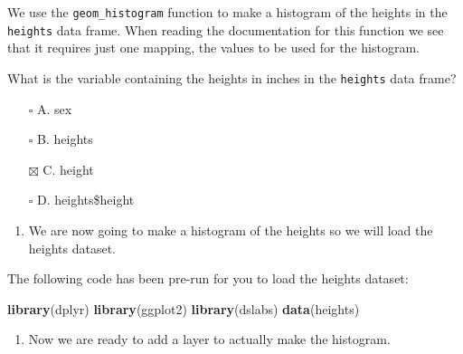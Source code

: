 \documentclass[
]{article}
\newenvironment{Shaded}{\begin{snugshade}}{\end{snugshade}}
\newcommand{\CommentTok}[1]{\textcolor[rgb]{0.56,0.35,0.01}{\textit{#1}}}
\newcommand{\KeywordTok}[1]{\textcolor[rgb]{0.13,0.29,0.53}{\textbf{#1}}}
\newcommand{\NormalTok}[1]{#1}
\newcommand{\OperatorTok}[1]{\textcolor[rgb]{0.81,0.36,0.00}{\textbf{#1}}}
\newcommand{\StringTok}[1]{\textcolor[rgb]{0.31,0.60,0.02}{#1}}
\providecommand{\tightlist}{%
  \setlength{\itemsep}{0pt}\setlength{\parskip}{0pt}}
\begin{document}
We use the \texttt{geom\_histogram} function to make a histogram of the
heights in the \texttt{heights} data frame. When reading the
documentation for this function we see that it requires just one
mapping, the values to be used for the histogram.

What is the variable containing the heights in inches in the
\texttt{heights} data frame?

\begin{itemize}
\tightlist
\item[$\square$]
  A. sex
\item[$\square$]
  B. heights
\item[$\boxtimes$]
  C. height
\item[$\square$]
  D. heights\$height
\end{itemize}

\begin{enumerate}
\def\labelenumi{\arabic{enumi}.}
\setcounter{enumi}{15}
\tightlist
\item
  We are now going to make a histogram of the heights so we will load
  the heights dataset.
\end{enumerate}

The following code has been pre-run for you to load the heights dataset:

\begin{Shaded}
\begin{Highlighting}[]
\KeywordTok{library}\NormalTok{(dplyr)}
\KeywordTok{library}\NormalTok{(ggplot2)}
\KeywordTok{library}\NormalTok{(dslabs)}
\KeywordTok{data}\NormalTok{(heights)}
\end{Highlighting}
\end{Shaded}

\begin{Shaded}
\end{Shaded}

\begin{enumerate}
\def\labelenumi{\arabic{enumi}.}
\setcounter{enumi}{16}
\tightlist
\item
  Now we are ready to add a layer to actually make the histogram.
\end{enumerate}

\begin{Shaded}
\end{Shaded}
\end{document}
